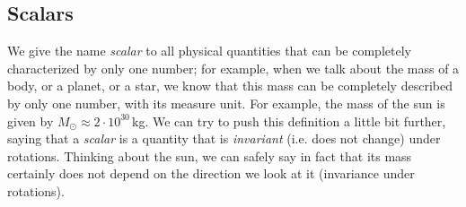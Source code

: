 \documentclass[11pt, a4paper,oneside,openright]{book}
\numberwithin{equation}{section}
\begin{document}
\subsection{Scalars}
We give the name \textit{scalar} to all physical quantities that can be completely characterized by only one number; for example, when we talk about the mass of a body, or a planet, or a star, we know that this mass can be completely described by only one number, with its measure unit. For example, the mass of the sun is given by $M_\odot\approx 2\cdot 10^{30}$\,kg. We can try to push this definition a little bit further, saying that a \textit{scalar} is a quantity that is \textit{invariant} (i.e. does not change) under rotations. Thinking about the sun, we can safely say in fact that its mass certainly does not depend on the direction we look at it (invariance under rotations). 
\end{document}
